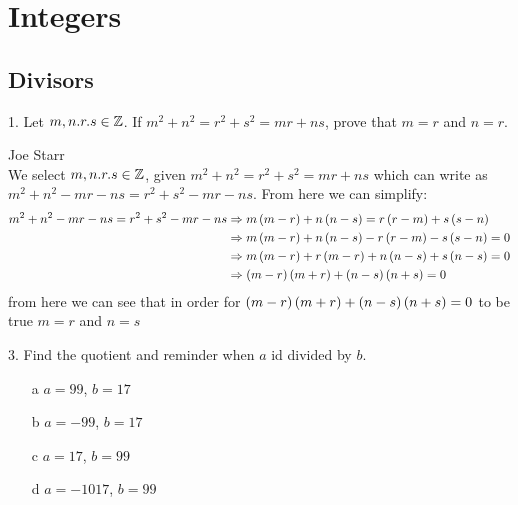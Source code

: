 \section{Integers}  
\subsection{Divisors}
\begin{mdframed}[style=darkQuesion]
1.    Let $m,n.r.s\in \mathbb{Z}$. If $m^2+n^2=r^2+s^2=mr+ns$, prove that $m=r$ and 
$n=r$.
\end{mdframed}

\begin{mdframed}[style=darkAnswer]
Joe Starr\\
We select $m,n.r.s\in \mathbb{Z}$, given $m^2+n^2=r^2+s^2=mr+ns$ which can write
as $m^2+n^2-mr-ns=r^2+s^2-mr-ns$. From here we can simplify:
\begin{align*}
m^2+n^2-mr-ns=r^2+s^2-mr-ns &\Rightarrow 
m\left(m-r\right)+n\left(n-s\right)=r\left(r-m\right)+s\left(s-n\right) \\
&\Rightarrow m\left(m-r\right)+n\left(n-s\right)-r\left(r-m\right)-s\left(s-n\right)=0 \\
&\Rightarrow m\left(m-r\right)+r\left(m-r\right)+n\left(n-s\right)+s\left(n-s\right)=0 \\
&\Rightarrow \left(m-r\right)\left(m+r\right)+\left(n-s\right)\left(n+s\right)=0 \\
\end{align*}
from here we can see that in order for $\left(m-r\right)\left(m+r\right)+\left(n-s\right)\left(n+s\right)=0$
to be true $m=r$ and $n=s$
\end{mdframed}
\newpage
\begin{mdframed}[style=darkQuesion]
3.    Find the quotient and reminder when $a$ id divided by $b$. 
\begin{itemize}
    \item [a] {$a=99$, $b=17$}
    \item [b] {$a=-99$, $b=17$}
    \item [c] {$a=17$, $b=99$}
    \item [d] {$a=-1017$, $b=99$}
\end{itemize}

\end{mdframed}

